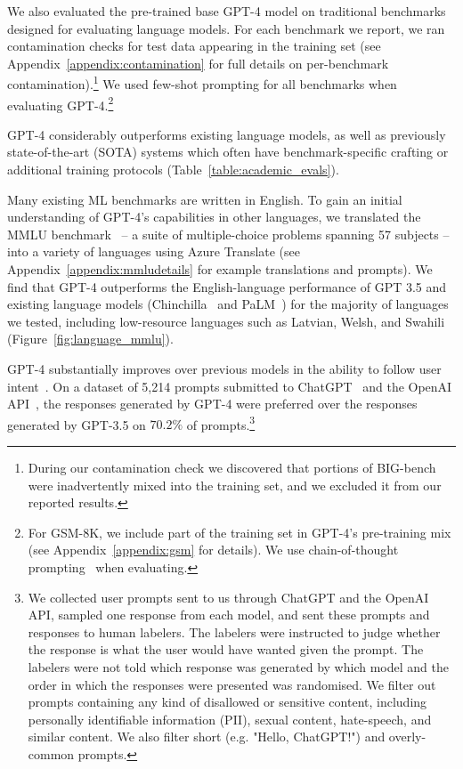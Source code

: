 We also evaluated the pre-trained base GPT-4 model on traditional benchmarks designed for evaluating language models. For each benchmark we report, we ran contamination checks for test data appearing in the training set (see Appendix~\ref{appendix:contamination} for full details on per-benchmark contamination).\footnote{During our contamination check we discovered that portions of BIG-bench~\citep{srivastava2022beyond} were inadvertently mixed into the training set, and we excluded it from our reported results.} We used few-shot prompting \citep{brown2020language} for all benchmarks when evaluating GPT-4.\footnote{For GSM-8K, we include part of the training set in GPT-4's pre-training mix (see Appendix~\ref{appendix:gsm} for details). We use chain-of-thought prompting~\citep{wei2022chain} when evaluating.}

GPT-4 considerably outperforms existing language models, as well as previously state-of-the-art (SOTA) systems which often have benchmark-specific crafting or additional training protocols (Table~\ref{table:academic_evals}).

Many existing ML benchmarks are written in English. To gain an initial understanding of GPT-4's capabilities in other languages, we translated the MMLU benchmark~\citep{hendryckstest2021,hendrycks2021ethics} -- a suite of multiple-choice problems spanning 57 subjects -- into a variety of languages using Azure Translate (see Appendix~\ref{appendix:mmludetails} for example translations and prompts). We find that GPT-4 outperforms the English-language performance of GPT 3.5 and existing language models (Chinchilla~\citep{hoffmann2022training} and PaLM~\citep{chowdhery2022palm}) for the majority of languages we tested, including low-resource languages such as Latvian, Welsh, and Swahili (Figure~\ref{fig:language_mmlu}).

GPT-4 substantially improves over previous models in the ability to follow user intent~\cite{ouyang2022training}. On a dataset of 5,214 prompts submitted to ChatGPT~\cite{openaichatgptblog} and the OpenAI API~\cite{openaiapiblog}, the responses generated by GPT-4 were preferred over the responses generated by GPT-3.5 on $70.2\%$ of prompts.\footnote{We collected user prompts sent to us through ChatGPT and the OpenAI API, sampled one response from each model, and sent these prompts and responses to human labelers. The labelers were instructed to judge whether the response is what the user would have wanted given the prompt. The labelers were not told which response was generated by which model and the order in which the responses were presented was randomised. We filter out prompts containing any kind of disallowed or sensitive content, including personally identifiable information (PII), sexual content, hate-speech, and similar content. We also filter short (e.g. "Hello, ChatGPT!") and overly-common prompts.}

